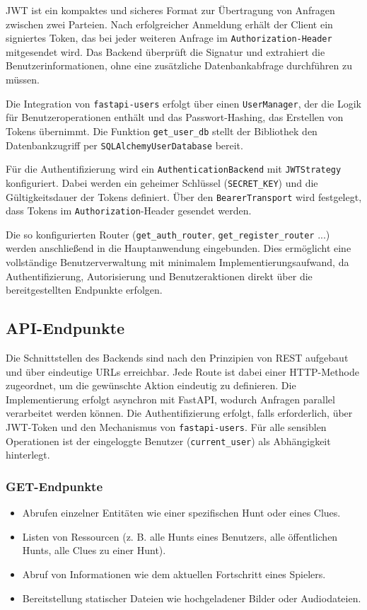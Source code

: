 \documentclass[oneside]{ausarbeitung}
\begin{document}
JWT ist ein kompaktes und sicheres Format zur Übertragung von Anfragen zwischen zwei Parteien. Nach erfolgreicher Anmeldung erhält der Client ein signiertes Token, das bei jeder weiteren Anfrage im \texttt{Authorization-Header} mitgesendet wird.  
Das Backend überprüft die Signatur und extrahiert die Benutzerinformationen, ohne eine zusätzliche Datenbankabfrage durchführen zu müssen.

Die Integration von \texttt{fastapi-users} erfolgt über einen \texttt{UserManager}, 
der die Logik für Benutzeroperationen enthält und das Passwort-Hashing, 
das Erstellen von Tokens übernimmt.  
Die Funktion \texttt{get\_user\_db} stellt der Bibliothek den Datenbankzugriff 
per \texttt{SQLAlchemyUserDatabase} bereit.  

Für die Authentifizierung wird ein \texttt{AuthenticationBackend} mit 
\texttt{JWTStrategy} konfiguriert. Dabei werden ein geheimer Schlüssel 
(\texttt{SECRET\_KEY}) und die Gültigkeitsdauer der Tokens definiert.  
Über den \texttt{BearerTransport} wird festgelegt, dass Tokens im 
\texttt{Authorization}-Header gesendet werden.  

Die so konfigurierten Router (\texttt{get\_auth\_router}, \texttt{get\_register\_router} ...) werden anschließend in die Hauptanwendung eingebunden.  
Dies ermöglicht eine vollständige Benutzerverwaltung mit minimalem Implementierungsaufwand, 
da Authentifizierung, Autorisierung und Benutzeraktionen direkt über die 
bereitgestellten Endpunkte erfolgen.

\subsection{API-Endpunkte}

Die Schnittstellen des Backends sind nach den Prinzipien von REST aufgebaut und über eindeutige URLs erreichbar. 
Jede Route ist dabei einer HTTP-Methode zugeordnet, um die gewünschte Aktion eindeutig zu definieren. 
Die Implementierung erfolgt asynchron mit FastAPI, wodurch Anfragen parallel verarbeitet werden können. 
Die Authentifizierung erfolgt, falls erforderlich, über JWT-Token und den Mechanismus von \texttt{fastapi-users}. 
Für alle sensiblen Operationen ist der eingeloggte Benutzer (\texttt{current\_user}) als Abhängigkeit hinterlegt.

\subsubsection{GET-Endpunkte}
\begin{itemize}
    \item Abrufen einzelner Entitäten wie einer spezifischen Hunt oder eines Clues.
    \item Listen von Ressourcen (z. B. alle Hunts eines Benutzers, alle öffentlichen Hunts, alle Clues zu einer Hunt).
    \item Abruf von Informationen wie dem aktuellen Fortschritt eines Spielers.
    \item Bereitstellung statischer Dateien wie hochgeladener Bilder oder Audiodateien.
\end{itemize}
\end{document}
